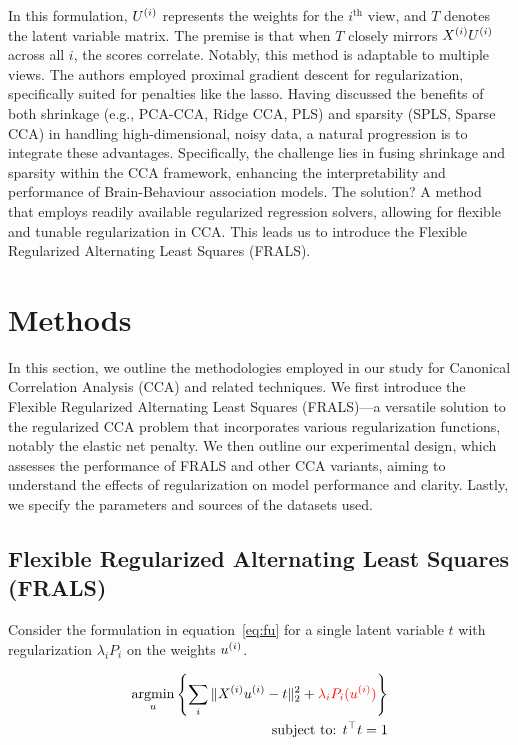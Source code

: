 In this formulation, \(U^{(i)}\) represents the \gls{weights} for the $i^{\text{th}}$ view, and \(T\) denotes the latent variable matrix.
The premise is that when \(T\) closely mirrors \(X^{(i)} U^{(i)}\) across all \(i\), the scores correlate.
Notably, this method is adaptable to multiple views.
The authors employed proximal gradient descent for regularization, specifically suited for penalties like the lasso.
Having discussed the benefits of both shrinkage (e.g., PCA-CCA, Ridge CCA, PLS) and sparsity (SPLS, Sparse CCA) in handling high-dimensional, noisy data, a natural progression is to integrate these advantages.
Specifically, the challenge lies in fusing shrinkage and sparsity within the CCA framework, enhancing the interpretability and performance of Brain-Behaviour association models.
The solution?
A method that employs readily available regularized regression solvers, allowing for flexible and tunable regularization in CCA.
This leads us to introduce the Flexible Regularized Alternating Least Squares (FRALS).
\newpage
\section{Methods}

In this section, we outline the methodologies employed in our study for Canonical Correlation Analysis (CCA) and related techniques.
We first introduce the Flexible Regularized Alternating Least Squares (FRALS)—a versatile solution to the regularized CCA problem that incorporates various regularization functions, notably the elastic net penalty\citep{zou2005regularization}.
We then outline our experimental design, which assesses the performance of FRALS and other CCA variants, aiming to understand the effects of regularization on model performance and clarity.
Lastly, we specify the parameters and sources of the datasets used.

\subsection{Flexible Regularized Alternating Least Squares (FRALS)}\label{subsec:flexible-regularized-alternating-least
-squares-(frals)}

Consider the formulation in equation~\ref{eq:fu} for a single latent variable \(t\) with regularization $\lambda_i P_i$ on the \gls{weights} \(u^{(i)}\).

\begin{align}
    \underset{u}{\mathrm{argmin}}\left\{\sum_i \|X^{(i)} u^{(i)} - t\|_2^2 + \textcolor{red}{\lambda_i P_i(u^{(i)})} \right\}\\
    \text{subject to: }t^\top t = 1\\
\end{align}

